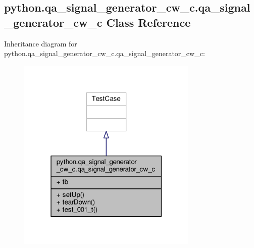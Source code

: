 \subsection{python.\+qa\+\_\+signal\+\_\+generator\+\_\+cw\+\_\+c.\+qa\+\_\+signal\+\_\+generator\+\_\+cw\+\_\+c Class Reference}
\label{classpython_1_1qa__signal__generator__cw__c_1_1qa__signal__generator__cw__c}


Inheritance diagram for python.\+qa\+\_\+signal\+\_\+generator\+\_\+cw\+\_\+c.\+qa\+\_\+signal\+\_\+generator\+\_\+cw\+\_\+c\+:
\nopagebreak
\begin{figure}[H]
\begin{center}
\leavevmode
\includegraphics[width=244pt]{d9/d96/classpython_1_1qa__signal__generator__cw__c_1_1qa__signal__generator__cw__c__inherit__graph}
\end{center}
\end{figure}


